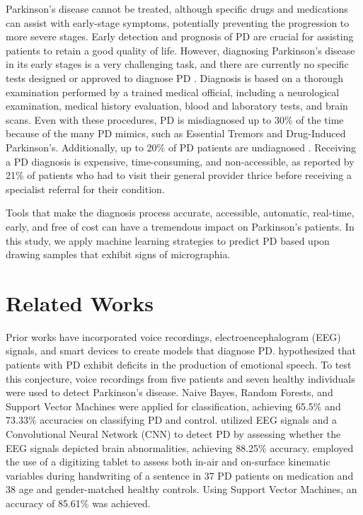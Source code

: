 \documentclass[pmlr,twocolumn,10pt,breaklinks, x11names,table]{jmlr} %
\begin{document}
Parkinson's disease cannot be treated, although specific drugs and medications can assist with early-stage symptoms, potentially preventing the progression to more severe stages. Early detection and prognosis of PD are crucial for assisting patients to retain a good quality of life. However, diagnosing Parkinson’s disease in its early stages is a very challenging task, and there are currently no specific tests designed or approved to diagnose PD \citep{national_institute_of_neurological_disorders_and_stroke}. Diagnosis is based on a thorough examination performed by a trained medical official, including a neurological examination, medical history evaluation, blood and laboratory tests, and brain scans. Even with these procedures, PD is misdiagnosed up to 30\% of the time because of the many PD mimics, such as Essential Tremors and Drug-Induced Parkinson’s. Additionally, up to 20\% of PD patients are undiagnosed \citep{schrag_ben-shlomo_quinn_2002}. Receiving a PD diagnosis is expensive, time-consuming, and non-accessible, as reported by 21\% of patients who had to visit their general provider thrice before receiving a specialist referral for their condition. \citep{gavidia_2020}

Tools that make the diagnosis process accurate, accessible, automatic, real-time, early, and free of cost can have a tremendous impact on Parkinson’s patients. In this study, we apply machine learning strategies to predict PD based upon drawing samples that exhibit signs of micrographia. 

\section{Related Works}
\label{related-works}
Prior works have incorporated voice recordings, electroencephalogram (EEG) signals, and smart devices to create models that diagnose PD. \citet{zhao2014automatic} hypothesized that patients with PD exhibit deficits in the production of emotional speech. To test this conjecture, voice recordings from five patients and seven healthy individuals were used to detect Parkinson’s disease. Naive Bayes, Random Forests, and Support Vector Machines were applied for classification, achieving 65.5\% and 73.33\% accuracies on classifying PD and control. \citet{oh2020deep} utilized EEG signals and a Convolutional Neural Network (CNN) to detect PD by assessing whether the EEG signals depicted brain abnormalities, achieving 88.25\% accuracy. \citet{drotar2014analysis} employed the use of a digitizing tablet to assess both in-air and on-surface kinematic variables during handwriting of a sentence in 37 PD patients on medication and 38 age and gender-matched healthy controls. Using Support Vector Machines, an accuracy of 85.61\% was achieved. 
\end{document}
